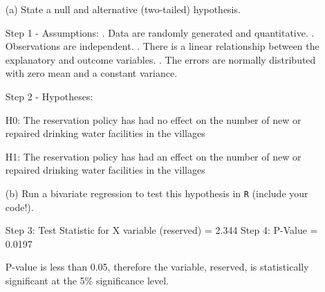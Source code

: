 \documentclass[12pt,letterpaper]{article}
\begin{document}
\newpage

\begin{enumerate}
	\item [(a)] State a null and alternative (two-tailed) hypothesis. 
	
	\noindent
	Step 1 - Assumptions:
	. Data are randomly generated and quantitative.
	. Observations are independent.
	. There is a linear relationship between the explanatory and outcome variables.
	. The errors are normally distributed with zero mean and a constant variance. 
	
	Step 2 - Hypotheses:
	
	H0: The reservation policy has had no effect on the number of new or repaired drinking water facilities in the villages
	
	H1: The reservation policy has had an effect on the number of new or repaired drinking water facilities in the villages
	
	\newpage
	
	\vspace{1cm}
	\item [(b)] Run a bivariate regression to test this hypothesis in \texttt{R} (include your code!).
	
	
	\noindent
	Step 3: Test Statistic for X variable (reserved)  = 2.344
	\newline
	Step 4: P-Value = 0.0197
	
	P-value is less than 0.05, therefore the variable, reserved, is statistically significant at the 5\% significance level.
	

\end{enumerate}
\end{document}
